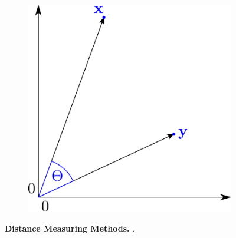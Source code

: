 \begin{figure}
\begin{subfigure}[b]{0.475\textwidth}
        \includegraphics[width=\textwidth]{Graphics/Cosinus.pdf}
    \end{subfigure}
    \caption[Distance Measuring Methods]{\textbf{Distance Measuring Methods.} .}
    \label{fig:Distance}
\end{figure}

\blindtext


